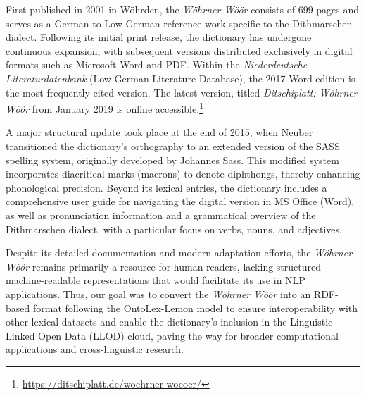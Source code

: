 \documentclass{article}
\begin{document}
First published in 2001 in Wöhrden, the \emph{Wöhrner Wöör} consists of 699 pages and serves as a German-to-Low-German reference work specific to the Dithmarschen dialect. Following its initial print release, the dictionary has undergone continuous expansion, with subsequent versions distributed exclusively in digital formats such as Microsoft Word and PDF. Within the \emph{Niederdeutsche Literaturdatenbank} (Low German Literature Database), the 2017 Word edition is the most frequently cited version. The latest version, titled \emph{Ditschiplatt: Wöhrner Wöör} from January 2019 is online accessible.\footnote{\url{https://ditschiplatt.de/woehrner-woeoer/}}

A major structural update took place at the end of 2015, when Neuber transitioned the dictionary's orthography to an extended version of the SASS spelling system, originally developed by Johannes Sass. This modified system incorporates diacritical marks (macrons) to denote diphthongs, thereby enhancing phonological precision. Beyond its lexical entries, the dictionary includes a comprehensive user guide for navigating the digital version in MS Office (Word), as well as pronunciation information and a grammatical overview of the Dithmarschen dialect, with a particular focus on verbs, nouns, and adjectives.

Despite its detailed documentation and modern adaptation efforts, the \emph{Wöhrner Wöör} remains primarily a resource for human readers, lacking structured machine-readable representations that would facilitate its use in NLP applications. Thus, our goal was to convert the \emph{Wöhrner Wöör} into an RDF-based format following the OntoLex-Lemon model to ensure interoperability with other lexical datasets and enable the dictionary’s inclusion in the Linguistic Linked Open Data (LLOD) cloud, paving the way for broader computational applications and cross-linguistic research.
\end{document}
